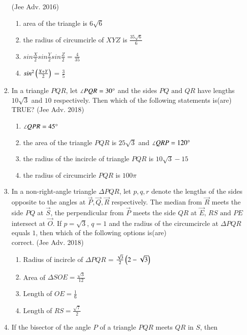 \begin{enumerate}[label=\thesubsection.\arabic*,ref=\thesubsection.\theenumi]
    \hfill{(Jee Adv. 2016)}
    \begin{enumerate}
    	\item area of the triangle is $6\sqrt{6}$
    	\item the radius of circumcirle of $XYZ$ is ${\frac{35\sqrt{6}}{6}}$
    	\item $sin\frac{X}{2}sin\frac{Y}{2}sin\frac{Z}{2} = \frac{4}{35}$
    	\item $sin^{2}\left(\frac{X+Y}{2}\right)$ = $\frac{3}{5}$
    \end{enumerate}
    \item In a triangle $PQR$, let $\angle PQR = 30\degree$ and the sides $PQ \text{ and } QR$ have lengths $10\sqrt{3}$ and $10$ respectively. Then which of the following statements is(are) TRUE?
    \hfill{(Jee Adv. 2018)}
    \begin{enumerate}
    	\item $\angle QPR = 45\degree$
    	\item the area of the triangle $PQR$ is $25\sqrt{3}$ and $\angle QRP = 120\degree$
    	\item the radius of the incircle of triangle $PQR$ is $10\sqrt{3}-15$
    	\item the radius of circumcirle $PQR$ is $100\pi$
    \end{enumerate}
    \item In a non-right-angle triangle $\Delta PQR$, let $p,q,r$ denote the lengths of the sides opposite to the angles at $\vec{P},\vec{Q},\vec{R}$ respectively. The median from $\vec{R}$ meets the side $PQ$ at $\vec{S}$, the perpendicular from $\vec{P}$ meets the side $QR$ at $\vec{E}$, $RS \text{ and } PE$ intersect at $\vec{O}$. If $p = \sqrt{3}$, $q = 1$ and the radius of the circumcircle at $\Delta PQR$ equals $1$, then which of the following options is(are)\\ correct.
    \hfill{(Jee Adv. 2018)}
    \begin{enumerate}
    	\item Radius of incircle of $\Delta PQR$ = $\frac{\sqrt{3}}{2}\left(2-\sqrt{3}\right)$
    	\item Area of $\Delta SOE = \frac{\sqrt{3}}{12}$
    	\item Length of $OE = \frac{1}{6}$
    	\item Length of $RS = \frac{\sqrt{7}}{2}$
    \end{enumerate}
    \item If the bisector of the angle $P$ of a triangle $PQR$ meets $QR$ in $S$, then
\begin{multicols}{4}

\end{multicols}
\end{enumerate}
